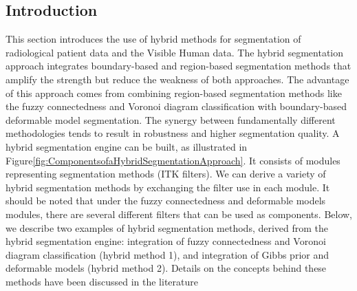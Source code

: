 %
%
% 
%
%
%

\subsection{Introduction}
\label{sec:HybridSegmentationIntroduction}
  This section introduces the use of hybrid methods for segmentation
of radiological patient data and the Visible Human data. The hybrid
segmentation approach integrates boundary-based and region-based
segmentation methods that amplify the strength but reduce the
weakness of both approaches. The advantage of this approach comes
from combining region-based segmentation methods like the fuzzy
connectedness and Voronoi diagram classification with boundary-based
deformable model segmentation. The synergy between fundamentally
different methodologies tends to result in robustness and higher
segmentation quality.  A hybrid segmentation engine can be built, as
illustrated in
Figure\ref{fig:ComponentsofaHybridSegmentationApproach}. It consists
of modules representing segmentation methods (ITK filters). We can
derive a variety of hybrid segmentation methods by exchanging the
filter use in each module. It should be noted that under the fuzzy
connectedness and deformable models modules, there are several
different filters that can be used as components. Below, we describe
two examples of hybrid segmentation methods, derived from the hybrid
segmentation engine: integration of fuzzy connectedness and Voronoi
diagram classification (hybrid method 1), and integration of Gibbs
prior and deformable models (hybrid method 2).  Details on the
concepts behind these methods have been discussed in the literature
\cite{Angelini2002,Udupa2002,Jin2002,Imielinska2001,Imielinska2000a,Imielinska2000b}



